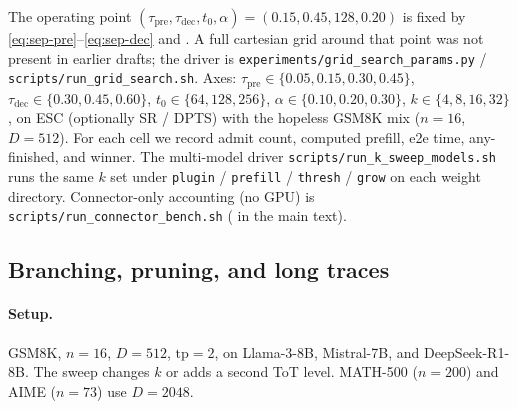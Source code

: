 The operating point $(\tau_{\mathrm{pre}},\tau_{\mathrm{dec}},t_0,\alpha)=(0.15,0.45,128,0.20)$ is fixed by \eqref{eq:sep-pre}--\eqref{eq:sep-dec} and .
A full cartesian grid around that point was not present in earlier drafts; the driver is
\texttt{experiments/grid\_search\_params.py} / \texttt{scripts/run\_grid\_search.sh}.
Axes: $\tau_{\mathrm{pre}}\in\{0.05,0.15,0.30,0.45\}$,
$\tau_{\mathrm{dec}}\in\{0.30,0.45,0.60\}$,
$t_0\in\{64,128,256\}$,
$\alpha\in\{0.10,0.20,0.30\}$,
$k\in\{4,8,16,32\}$,
on ESC (optionally SR / DPTS) with the hopeless GSM8K mix ($n{=}16$, $D{=}512$).
For each cell we record admit count, computed prefill, e2e time, any-finished, and winner.
The multi-model driver \texttt{scripts/run\_k\_sweep\_models.sh} runs the same $k$ set under
\texttt{plugin} / \texttt{prefill} / \texttt{thresh} / \texttt{grow} on each weight directory.
Connector-only accounting (no GPU) is \texttt{scripts/run\_connector\_bench.sh}
( in the main text).

\subsection{Branching, pruning, and long traces}
\label{sec:eval-sens}

\paragraph{Setup.}
GSM8K, $n{=}16$, $D{=}512$, $\mathrm{tp}{=}2$, on Llama-3-8B, Mistral-7B, and DeepSeek-R1-8B.
The sweep changes $k$ or adds a second ToT level.
MATH-500 ($n{=}200$) and AIME ($n{=}73$) use $D{=}2048$.

